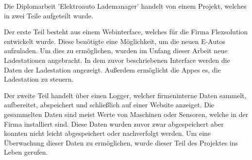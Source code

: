 Die Diplomarbeit 'Elektroauto Lademanager' handelt von einem Projekt, welches in zwei Teile aufgeteilt wurde.

Der erste Teil besteht aus einem Webinterface, welches für die Firma Flexsolution entwickelt wurde. Diese benötigte eine Möglichkeit, um die neuen E-Autos aufzuladen. Um dies zu ermöglichen, wurden im Unfang dieser Arbeit neue Ladestationen angebracht. In dem zuvor beschriebenen Interface werden die Daten der Ladestation angezeigt. Außerdem ermöglicht die Appes es, die Ladestation zu steuern.

Der zweite Teil handelt über einen Logger, welcher firmeninterne Daten sammelt, aufbereitet, abspeichert und schließlich auf einer Website anzeiget. Die gesammelten Daten sind meist Werte von Maschinen oder Sensoren, welche in der Firma installiert sind. Diese Daten wurden zuvor zwar abgespeichert aber konnten nicht leicht abgespeichert oder nachverfolgt werden. Um eine Überwachung dieser Daten zu ermöglichen, wurde dieser Teil des Projektes ins Leben gerufen.
